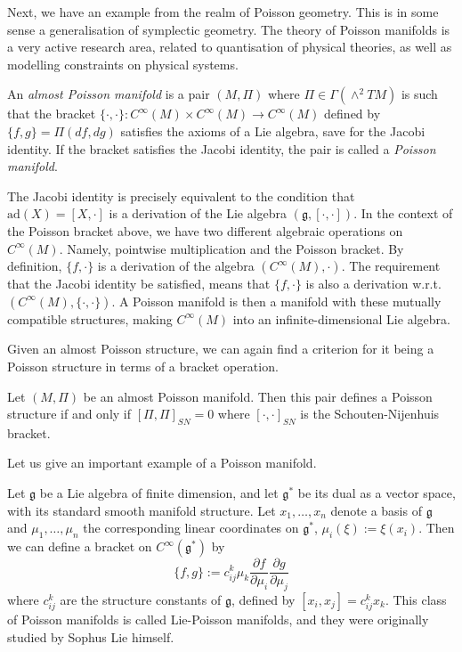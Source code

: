Next, we have an example from the realm of Poisson geometry. This is in some sense a generalisation of symplectic geometry. The theory of Poisson manifolds is a very active research area, related to quantisation of physical theories, as well as modelling constraints on physical systems.
\begin{definition}
  An \emph{almost Poisson manifold} is a pair $(M,\Pi)$ where $\Pi\in\Gamma(\wedge^2TM)$ is such that the bracket $\{\cdot,\cdot\}:C^\infty(M)\times C^\infty(M)\to C^\infty(M)$ defined by $\{f,g\}=\Pi(df,dg)$ satisfies the axioms of a Lie algebra, save for the Jacobi identity. If the bracket satisfies the Jacobi identity, the pair is called a \emph{Poisson manifold}.
\end{definition}
\begin{remark}
  The Jacobi identity is precisely equivalent to the condition that $\text{ad}(X)=[X,\cdot]$ is a derivation of the Lie algebra $(\mathfrak{g},[\cdot,\cdot])$. In the context of the Poisson bracket above, we have two different algebraic operations on $C^\infty(M)$. Namely, pointwise multiplication and the Poisson bracket. By definition, $\{f,\cdot\}$ is a derivation of the algebra $(C^\infty(M),\cdot)$. The requirement that the Jacobi identity be satisfied, means that $\{f,\cdot\}$ is also a derivation w.r.t. $(C^\infty(M),\{\cdot,\cdot\})$. A Poisson manifold is then a manifold with these mutually compatible structures, making $C^\infty(M)$ into an infinite-dimensional Lie algebra.
\end{remark}
Given an almost Poisson structure, we can again find a criterion for it being a Poisson structure in terms of a bracket operation.
\begin{theorem}
  Let $(M,\Pi)$ be an almost Poisson manifold. Then this pair defines a Poisson structure if and only if $[\Pi,\Pi]_{SN}=0$ where $[\cdot,\cdot]_{SN}$ is the Schouten-Nijenhuis bracket.
\end{theorem}
Let us give an important example of a Poisson manifold.
\begin{example}
  Let $\mathfrak{g}$ be a Lie algebra of finite dimension, and let $\mathfrak{g}^*$ be its dual as a vector space, with its standard smooth manifold structure. Let $x_1,\dots,x_n$ denote a basis of $\mathfrak{g}$ and $\mu_1,\dots,\mu_n$ the corresponding linear coordinates on $\mathfrak{g}^*$, $\mu_i(\xi) := \xi(x_i)$. Then we can define a bracket on $C^\infty(\mathfrak{g}^*)$ by
  $$\{f,g\}:= c_{ij}^k\mu_k\frac{\partial f}{\partial\mu_i}\frac{\partial g}{\partial\mu_j}$$
  where $c_{ij}^k$ are the structure constants of $\mathfrak{g}$, defined by $[x_i,x_j]=c_{ij}^kx_k$. This class of Poisson manifolds is called Lie-Poisson manifolds, and they were originally studied by Sophus Lie himself.
\end{example}
